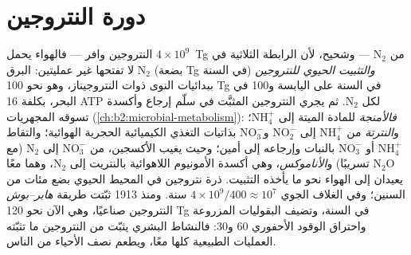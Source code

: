 \section{دورة النتروجين}

\begin{proposition}\label{prop:b2:biogeochemical-cycles:nitrogen}
النتروجين وافر --- فالهواء يحمل $4\times 10^{9}$~Tg من
$\mathrm{N_2}$ --- وشحيح، لأن الرابطة الثلاثية في $\mathrm{N_2}$ لا تفتحها
غير عمليتين: البرق (بضعة Tg في السنة)
\emph{والتثبيت الحيوي للنتروجين} ببدائيات النوى ذوات
النتروجيناز، وهو نحو 100 Tg في السنة على اليابسة و100 في البحر، بكلفة
16 ATP لكل $\mathrm{N_2}$. ثم يجري النتروجين المثبَّت في سلّم
إرجاع وأكسدة تسوقه المجهريات (\cref{ch:b2:microbial-metabolism}):
\emph{فالأمنجة} للمادة الميتة إلى $\mathrm{NH_4^{+}}$؛
و\emph{النترتة} من $\mathrm{NH_4^{+}}$ إلى $\mathrm{NO_2^{-}}$ و$\mathrm{NO_3^{-}}$ بذاتيات
التغذي الكيميائية الحجرية الهوائية؛ والتقاط $\mathrm{NH_4^{+}}$ أو $\mathrm{NO_3^{-}}$ بالنبات
وإرجاعه إلى أمين؛ وحيث يغيب الأكسجين،
\emph{} من $\mathrm{NO_3^{-}}$ إلى $\mathrm{N_2}$ (مع $\mathrm{N_2O}$
تسريبًا) و\emph{الأناموكس}، وهي أكسدة الأمونيوم اللاهوائية
بالنتريت إلى $\mathrm{N_2}$، وهما معًا يعيدان إلى الهواء نحو ما يأخذه
التثبيت.  ذرة نتروجين في
المحيط الحيوي بضع مئات من السنين؛ وفي الغلاف الجوي $4\times
10^{9}/400 \approx 10^{7}$ سنة. ومنذ 1913 ثبّتت طريقة \emph{هابر--بوش}
النتروجين صناعيًا، وهي الآن نحو 120 Tg في السنة،
وتضيف البقوليات المزروعة واحتراق الوقود الأحفوري 60 و30:
فالنشاط البشري يثبّت من النتروجين ما تثبّته العمليات الطبيعية
كلها معًا، ويطعم نصف الأحياء من الناس.
\end{proposition}

